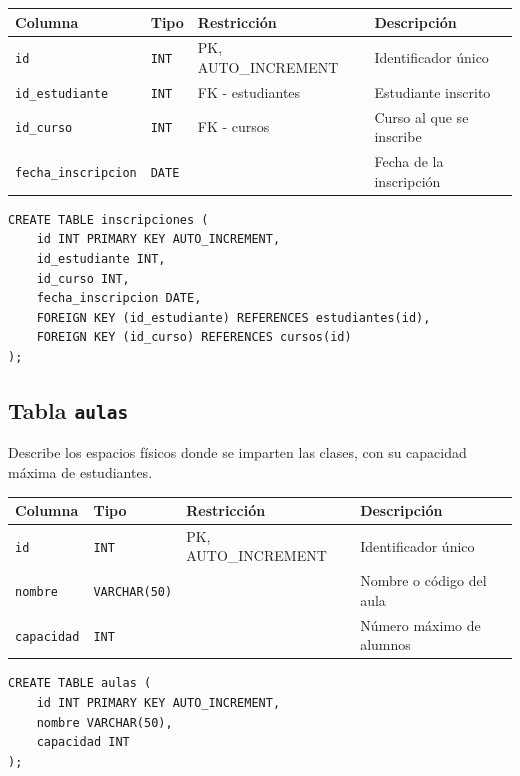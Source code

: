 \documentclass[12pt,a4paper]{article}
\begin{document}
\begin{center}
\begin{tabular}{llll}
  \hline
  \textbf{Columna} & \textbf{Tipo} & \textbf{Restricción} & \textbf{Descripción} \\
  \hline
  \texttt{id}                 & \texttt{INT}  & PK, AUTO\_INCREMENT  & Identificador único \\
  \texttt{id\_estudiante}     & \texttt{INT}  & FK - estudiantes    & Estudiante inscrito \\
  \texttt{id\_curso}          & \texttt{INT}  & FK - cursos         & Curso al que se inscribe \\
  \texttt{fecha\_inscripcion} & \texttt{DATE} &                      & Fecha de la inscripción \\
  \hline
\end{tabular}
\end{center}
 
\begin{lstlisting}[caption={SQL -- inscripciones}]
CREATE TABLE inscripciones (
    id INT PRIMARY KEY AUTO_INCREMENT,
    id_estudiante INT,
    id_curso INT,
    fecha_inscripcion DATE,
    FOREIGN KEY (id_estudiante) REFERENCES estudiantes(id),
    FOREIGN KEY (id_curso) REFERENCES cursos(id)
);
\end{lstlisting}
 
\subsection{Tabla \texttt{aulas}}
 
Describe los espacios físicos donde se imparten las clases, con su
capacidad máxima de estudiantes.
 
\begin{center}
\begin{tabular}{llll}
  \hline
  \textbf{Columna} & \textbf{Tipo} & \textbf{Restricción} & \textbf{Descripción} \\
  \hline
  \texttt{id}        & \texttt{INT}         & PK, AUTO\_INCREMENT & Identificador único \\
  \texttt{nombre}    & \texttt{VARCHAR(50)} &                     & Nombre o código del aula \\
  \texttt{capacidad} & \texttt{INT}         &                     & Número máximo de alumnos \\
  \hline
\end{tabular}
\end{center}
 
\begin{lstlisting}[caption={SQL -- aulas}]
CREATE TABLE aulas (
    id INT PRIMARY KEY AUTO_INCREMENT,
    nombre VARCHAR(50),
    capacidad INT
);
\end{lstlisting}
 
\end{document}
